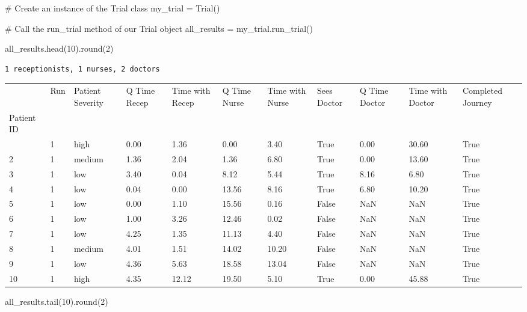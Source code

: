 \documentclass[
  letterpaper,
  DIV=11,
  numbers=noendperiod]{scrreprt}
\newenvironment{Shaded}{}{}
\newcommand{\BuiltInTok}[1]{\textcolor[rgb]{0.84,0.23,0.29}{#1}}
\newcommand{\CommentTok}[1]{\textcolor[rgb]{0.42,0.45,0.49}{#1}}
\newcommand{\DecValTok}[1]{\textcolor[rgb]{0.00,0.36,0.77}{#1}}
\newcommand{\NormalTok}[1]{\textcolor[rgb]{0.14,0.16,0.18}{#1}}
\newcommand{\OperatorTok}[1]{\textcolor[rgb]{0.14,0.16,0.18}{#1}}
\begin{document}
\begin{Shaded}
\begin{Highlighting}[]
\CommentTok{\# Create an instance of the Trial class}
\NormalTok{my\_trial }\OperatorTok{=}\NormalTok{ Trial()}

\CommentTok{\# Call the run\_trial method of our Trial object}
\NormalTok{all\_results }\OperatorTok{=}\NormalTok{ my\_trial.run\_trial()}

\NormalTok{all\_results.head(}\DecValTok{10}\NormalTok{).}\BuiltInTok{round}\NormalTok{(}\DecValTok{2}\NormalTok{)}
\end{Highlighting}
\end{Shaded}

\begin{verbatim}
1 receptionists, 1 nurses, 2 doctors
\end{verbatim}

\begin{longtable}[]{@{}lllllllllll@{}}
\toprule\noalign{}
& Run & Patient Severity & Q Time Recep & Time with Recep & Q Time Nurse
& Time with Nurse & Sees Doctor & Q Time Doctor & Time with Doctor &
Completed Journey \\
Patient ID & & & & & & & & & & \\
\midrule\noalign{}
\endhead
\bottomrule\noalign{}
\endlastfoot
1 & 1 & high & 0.00 & 1.36 & 0.00 & 3.40 & True & 0.00 & 30.60 & True \\
2 & 1 & medium & 1.36 & 2.04 & 1.36 & 6.80 & True & 0.00 & 13.60 &
True \\
3 & 1 & low & 3.40 & 0.04 & 8.12 & 5.44 & True & 8.16 & 6.80 & True \\
4 & 1 & low & 0.04 & 0.00 & 13.56 & 8.16 & True & 6.80 & 10.20 & True \\
5 & 1 & low & 0.00 & 1.10 & 15.56 & 0.16 & False & NaN & NaN & True \\
6 & 1 & low & 1.00 & 3.26 & 12.46 & 0.02 & False & NaN & NaN & True \\
7 & 1 & low & 4.25 & 1.35 & 11.13 & 4.40 & False & NaN & NaN & True \\
8 & 1 & medium & 4.01 & 1.51 & 14.02 & 10.20 & False & NaN & NaN &
True \\
9 & 1 & low & 4.36 & 5.63 & 18.58 & 13.04 & False & NaN & NaN & True \\
10 & 1 & high & 4.35 & 12.12 & 19.50 & 5.10 & True & 0.00 & 45.88 &
True \\
\end{longtable}

\begin{Shaded}
\begin{Highlighting}[]
\NormalTok{all\_results.tail(}\DecValTok{10}\NormalTok{).}\BuiltInTok{round}\NormalTok{(}\DecValTok{2}\NormalTok{)}
\end{Highlighting}
\end{Shaded}
\end{document}
